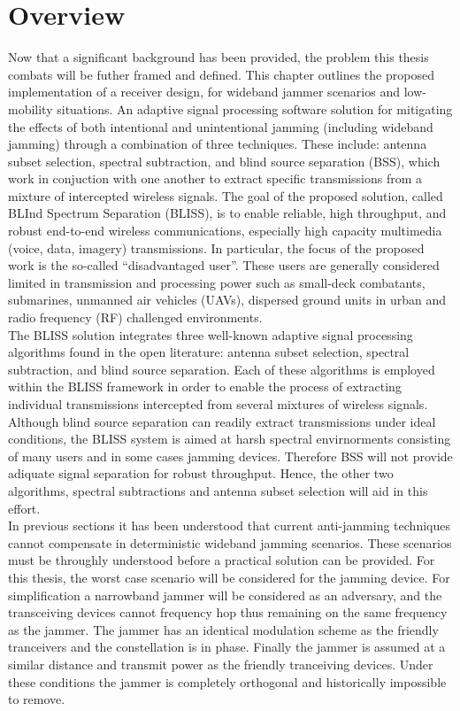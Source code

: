 \section{Overview}

Now that a significant background has been provided, the problem this thesis combats will be futher framed and defined.  This chapter outlines the proposed implementation of a receiver design, for wideband jammer scenarios and low-mobility situations.  An adaptive signal processing software solution for mitigating the effects of both intentional and unintentional jamming (including wideband jamming) through a combination of three techniques.  These include: antenna subset selection, spectral subtraction, and blind source separation (BSS), which work in conjuction with one another to extract specific transmissions from a mixture of intercepted wireless signals. The goal of the proposed solution, called BLInd Spectrum Separation (BLISS), is to enable reliable, high throughput, and robust end-to-end wireless communications, especially high capacity multimedia (voice, data, imagery) transmissions. In particular, the focus of the proposed work is the so-called ``disadvantaged user''.  These users are generally considered limited in transmission and processing power such as small-deck combatants, submarines, unmanned air vehicles (UAVs), dispersed ground units in urban and radio frequency (RF) challenged environments.\\

The BLISS solution integrates three well-known adaptive signal processing algorithms found in the open literature: antenna subset selection, spectral subtraction, and blind source separation. Each of these algorithms is employed within the BLISS framework in order to enable the process of extracting individual transmissions intercepted from several mixtures of wireless signals. Although blind source separation can readily extract transmissions under ideal conditions, the BLISS system is aimed at harsh spectral envirnorments consisting of many users and in some cases jamming devices. Therefore BSS will not provide adiquate signal separation for robust throughput.  Hence, the other two algorithms, spectral subtractions and antenna subset selection will aid in this effort.\\

In previous sections it has been understood that current anti-jamming techniques cannot compensate in deterministic wideband jamming scenarios.  These scenarios must be throughly understood before a practical solution can be provided.  For this thesis, the worst case scenario will be considered for the jamming device.  For simplification a narrowband jammer will be considered as an adversary, and the transceiving devices cannot frequency hop thus remaining on the same frequency as the jammer.  The jammer has an identical modulation scheme as the friendly tranceivers and the constellation is in phase.  Finally the jammer is assumed at a similar distance and transmit power as the friendly tranceiving devices.  Under these conditions the jammer is completely orthogonal and historically impossible to remove.\\


